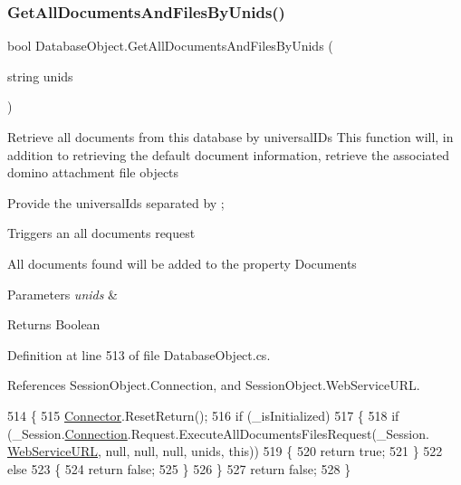 \subsubsection{\texorpdfstring{Get\+All\+Documents\+And\+Files\+By\+Unids()}{GetAllDocumentsAndFilesByUnids()}\hspace{0.1cm}{\footnotesize\ttfamily [1/2]}}
{\footnotesize\ttfamily bool Database\+Object.\+Get\+All\+Documents\+And\+Files\+By\+Unids (\begin{DoxyParamCaption}\item[{string}]{unids }\end{DoxyParamCaption})}



Retrieve all documents from this database by universal\+I\+Ds This function will, in addition to retrieving the default document information, retrieve the associated domino attachment file objects 

Provide the universal\+Ids separated by ;

Triggers an all documents request

All documents found will be added to the property \textquotesingle{}Documents\textquotesingle{}


\begin{DoxyParams}{Parameters}
{\em unids} & \\
\hline
\end{DoxyParams}
\begin{DoxyReturn}{Returns}
Boolean
\end{DoxyReturn}


Definition at line 513 of file Database\+Object.\+cs.



References Session\+Object.\+Connection, and Session\+Object.\+Web\+Service\+U\+RL.


\begin{DoxyCode}
514     \{
515         \mbox{\hyperlink{class_connector}{Connector}}.ResetReturn();
516         \textcolor{keywordflow}{if} (\_isInitialized)
517         \{
518             \textcolor{keywordflow}{if} (\_Session.\mbox{\hyperlink{class_session_object_a014bdbf705a753540e19bfb53030c55c}{Connection}}.Request.ExecuteAllDocumentsFilesRequest(\_Session.
      \mbox{\hyperlink{class_session_object_a697c071c812fbf7ad1166b896fb44c16}{WebServiceURL}}, null, null, null, unids, \textcolor{keyword}{this}))
519             \{
520                 \textcolor{keywordflow}{return} \textcolor{keyword}{true};
521             \}
522             \textcolor{keywordflow}{else}
523             \{
524                 \textcolor{keywordflow}{return} \textcolor{keyword}{false};
525             \}
526         \}
527         \textcolor{keywordflow}{return} \textcolor{keyword}{false};
528     \}
\end{DoxyCode}
\mbox{\label{class_database_object_aa69262a50977a28a2decf400d1eedd20}} 
